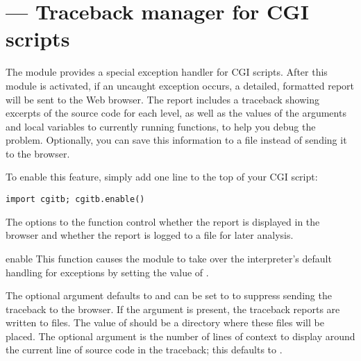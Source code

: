 \section{ ---
         Traceback manager for CGI scripts}



The  module provides a special exception handler for CGI
scripts.  After this module is activated, if an uncaught exception occurs,
a detailed, formatted report will be sent to the Web browser.  The report
includes a traceback showing excerpts of the source code for each level,
as well as the values of the arguments and local variables to currently
running functions, to help you debug the problem.  Optionally, you can
save this information to a file instead of sending it to the browser.

To enable this feature, simply add one line to the top of your CGI script:

\begin{verbatim}
import cgitb; cgitb.enable()
\end{verbatim}

The options to the  function control whether the
report is displayed in the browser and whether the report is logged
to a file for later analysis.


\begin{funcdesc}{enable}{}
  This function causes the  module to take over the
  interpreter's default handling for exceptions by setting the
  value of .

  The optional argument  defaults to  and can be set
  to  to suppress sending the traceback to the browser.
  If the argument  is present, the traceback reports are
  written to files.  The value of  should be a directory
  where these files will be placed.
  The optional argument  is the number of lines of
  context to display around the current line of source code in the
  traceback; this defaults to .
\end{funcdesc}

